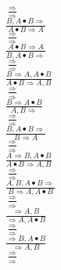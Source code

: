 \documentclass[11pt]{article}
\begin{document}
\begin{center}
\bigskip
\\$\frac{\Rightarrow }{\Rightarrow }$
\bigskip
\\$\frac{B, A\bullet B\Rightarrow }{A\bullet B\Rightarrow A}$
\bigskip
\\$\frac{\Rightarrow }{\Rightarrow }$
\bigskip
\\$\frac{A\bullet B\Rightarrow A}{B, A\bullet B\Rightarrow }$
\bigskip
\\$\frac{\Rightarrow }{\Rightarrow }$
\bigskip
\\$\frac{B\Rightarrow A, A\bullet B}{A\bullet B\Rightarrow A, B}$
\bigskip
\\$\frac{\Rightarrow }{\Rightarrow }$
\bigskip
\\$\frac{B\Rightarrow A\bullet B}{A, B\Rightarrow }$
\bigskip
\\$\frac{\Rightarrow }{\Rightarrow }$
\bigskip
\\$\frac{B, A\bullet B\Rightarrow }{B\Rightarrow A}$
\bigskip
\\$\frac{\Rightarrow }{\Rightarrow }$
\bigskip
\\$\frac{A\Rightarrow B, A\bullet B}{A\bullet B\Rightarrow A, B}$
\bigskip
\\$\frac{\Rightarrow }{\Rightarrow }$
\bigskip
\\$\frac{A, B, A\bullet B\Rightarrow }{B\Rightarrow A, A\bullet B}$
\bigskip
\\$\frac{\Rightarrow }{\Rightarrow }$
\bigskip
\\$\frac{\Rightarrow A, B}{\Rightarrow A, A\bullet B}$
\bigskip
\\$\frac{\Rightarrow }{\Rightarrow }$
\bigskip
\\$\frac{\Rightarrow B, A\bullet B}{\Rightarrow A, B}$
\bigskip
\\$\frac{\Rightarrow }{\Rightarrow }$
\bigskip
\\
\end{center}
\end{document}
